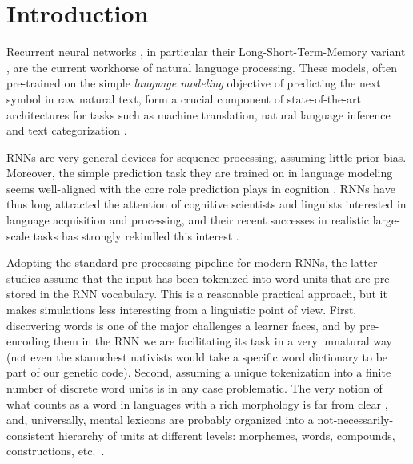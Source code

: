 \section{Introduction}
\label{sec:introduction}

Recurrent neural networks \cite[RNNs,][]{Elman:1990}, in particular
their Long-Short-Term-Memory variant
\cite[LSTMs,][]{Hochreiter:Schmidhuber:1997}, are the current
workhorse of natural language processing. These models, often
pre-trained on the simple \emph{language modeling} objective of
predicting the next symbol in raw natural text, form a crucial
component of state-of-the-art architectures for tasks such as machine
translation, natural language inference and text categorization
\cite{Goldberg:2017}.

RNNs are very general devices for sequence processing, assuming little
prior bias. Moreover, the simple prediction task they are trained on
in language modeling seems well-aligned with the core role prediction
plays in cognition \cite[e.g.,][]{Bar:2007,Clark:2016}. RNNs have thus
long attracted the attention of cognitive scientists and linguists
interested in language acquisition and processing, and their recent successes in
realistic large-scale tasks has strongly rekindled this interest
\cite[see, e.g.,][and references there]{Frank:etal:2013,Lau:etal:2017,Kirov:Cotterell:2018,McCoy:etal:2018,Pater:2018}.

Adopting the standard pre-processing pipeline for modern RNNs, the
latter studies assume that the input has been tokenized into word
units that are pre-stored in the RNN vocabulary. This is a reasonable
practical approach, but it makes simulations less interesting from a
linguistic point of view. First, discovering words is one of the major
challenges a learner faces, and by pre-encoding them in the RNN we are
facilitating its task in a very unnatural way (not even the staunchest
nativists would take a specific word dictionary to be part of our
genetic code). Second, assuming a unique tokenization into a finite
number of discrete word units is in any case problematic. The very
notion of what counts as a word in languages with a rich morphology is
far from clear \cite[e.g.,][]{Bickel:Zuniga:2017}, and, universally,
mental lexicons are probably organized into a
not-necessarily-consistent hierarchy of units at different levels:
morphemes, words, compounds, constructions,
etc.~\cite[e.g.,][]{Goldberg:2005}.

